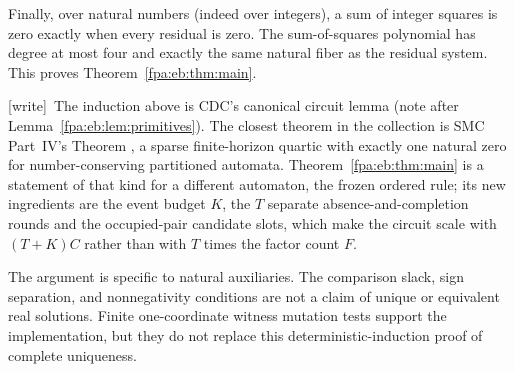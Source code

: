 \documentclass[11pt,a4paper]{article}
\numberwithin{equation}{section}
\newcommand{\wtag}{\textup{[write]}}
\begin{document}
Finally, over natural numbers (indeed over integers), a sum of integer squares is zero exactly when every residual is zero. The sum-of-squares polynomial has degree at most four and exactly the same natural fiber as the residual system. This proves Theorem~\ref{fpa:eb:thm:main}.

\wtag\ The induction above is CDC's canonical circuit lemma  (note after Lemma~\ref{fpa:eb:lem:primitives}). The closest theorem in the collection is SMC Part~IV's Theorem , a sparse finite-horizon quartic with exactly one natural zero for number-conserving partitioned automata. Theorem~\ref{fpa:eb:thm:main} is a statement of that kind for a different automaton, the frozen ordered rule; its new ingredients are the event budget $K$, the $T$ separate absence-and-completion rounds and the occupied-pair candidate slots, which make the circuit scale with $(T+K)C$ rather than with $T$ times the factor count $F$.

The argument is specific to natural auxiliaries. The comparison slack, sign separation, and nonnegativity conditions are not a claim of unique or equivalent real solutions. Finite one-coordinate witness mutation tests support the implementation, but they do not replace this deterministic-induction proof of complete uniqueness.
\end{document}
